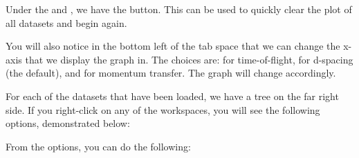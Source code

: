 \noindent{} 

Under the  and , we have the  button. This can be used to quickly clear the plot of all datasets and begin again.

You will also notice in the bottom left of the tab space  that we can change the x-axis that we display the graph in. The choices are:  for time-of-flight,  for d-spacing (the default), and  for momentum transfer. The graph will change accordingly. 

For each of the datasets that have been loaded, we have a  tree on the far right side. If you right-click on any of the workspaces, you will see the following options, demonstrated below:

\noindent{} 

From the options, you can do the following:

